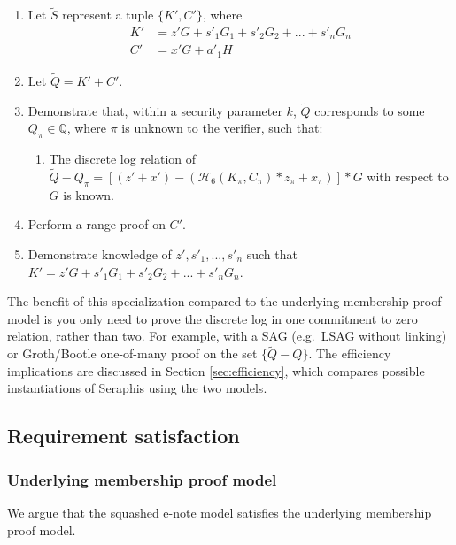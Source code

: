 \begin{appendices}
\begin{enumerate}
    \item Let $\tilde{S}$ represent a tuple $\{K', C'\}$, where\vspace{.115cm}
    \begin{align*}
        K' &= z' G + s'_1 G_1 + s'_2 G_2 + ... + s'_n G_n \\
        C' &= x' G + a'_1 H
    \end{align*}

    \item Let $\tilde{Q} = K' + C'$.

    \item Demonstrate that, within a security parameter $k$, $\tilde{Q}$ corresponds to some $Q_{\pi} \in \mathbb{Q}$, where $\pi$ is unknown to the verifier, such that:
    \begin{enumerate}
        \item The discrete log relation of $\tilde{Q} - Q_{\pi} = [(z' + x') - (\mathcal{H}_6(K_{\pi}, C_{\pi})*z_{\pi} + x_{\pi})]*G$ with respect to $G$ is known.
    \end{enumerate}

    \item Perform a range proof on $C'$.

    \item Demonstrate knowledge of $z', s'_1,...,s'_n$ such that $K' = z' G + s'_1 G_1 + s'_2 G_2 + ... + s'_n G_n$.
\end{enumerate}

The benefit of this specialization compared to the underlying membership proof model is you only need to prove the discrete log in one commitment to zero relation, rather than two. For example, with a SAG (e.g.\ LSAG \cite{Liu2004} without linking) or Groth/Bootle one-of-many proof on the set $\{\tilde{Q} - Q\}$. The efficiency implications are discussed in Section \ref{sec:efficiency}, which compares possible instantiations of Seraphis using the two models.


\subsection{Requirement satisfaction}
\label{appendix:squashed-e-note-model-req-satisfaction}

\subsubsection{Underlying membership proof model}

We argue that the squashed e-note model satisfies the underlying membership proof model.


\end{appendices}
